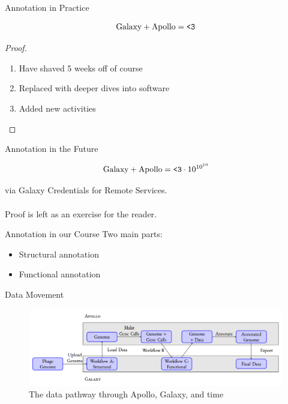 \documentclass[12pt]{beamer}
\begin{document}
\begin{frame}{Annotation in Practice}
    \begin{theorem}
        \begin{equation}
            \text{Galaxy} + \text{Apollo} = \text{\texttt{<3}}
        \end{equation}
    \end{theorem}
    \begin{proof}
        \begin{enumerate}
            \item Have shaved 5 weeks off of course
            \item Replaced with deeper dives into software
            \item Added new activities
        \end{enumerate}
    \end{proof}
\end{frame}

\begin{frame}{Annotation in the Future}
    \begin{theorem}
        \begin{equation}
            \text{Galaxy} + \text{Apollo} = \text{\texttt{<3}}\cdot10^{10^{10}}
        \end{equation}
    \end{theorem}
    via Galaxy Credentials for Remote Services.\\\ \\
    Proof is left as an exercise for the reader.
\end{frame}

\begin{frame}{Annotation in our Course}
    Two main parts:
    \begin{itemize}
        \item Structural annotation
        \item Functional annotation
    \end{itemize}
\end{frame}

\begin{frame}{Data Movement}
    \begin{figure}[!hb]
        \centering
        \includegraphics[width=\textwidth]{./ga.png}
        \caption{The data pathway through Apollo, Galaxy, and time}
    \end{figure}
\end{frame}
\end{document}
